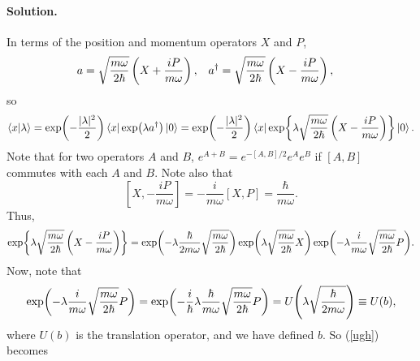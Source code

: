 \documentclass[11pt]{article}
\newcommand{\refeq}[1]{(\ref{#1})}
\newcommand{\beq}{\begin{equation*}}
\newcommand{\eeq}{\end{equation*}}
\newcommand{\beqn}{\begin{equation}}
\newcommand{\eeqn}{\end{equation}}
\newenvironment{solution}
{
    \paragraph{Solution.}
    \ignorespaces
}
{
}
\begin{document}
\begin{solution}
	In terms of the position and momentum operators $X$ and $P$,
	\begin{align*}
		a &= \sqrt{\frac{m\omega}{2\hbar}} \left( X + \frac{iP}{m\omega} \right), &
		a^\dagger &= \sqrt{\frac{m\omega}{2\hbar}} \left( X - \frac{iP}{m\omega} \right),
	\end{align*}
	so
	\beqn \label{ugh}
		\bkxlam = \exp(-\frac{|\lam|^2}{2}) \bx \exp(\lam \ad) \ko = \exp(-\frac{|\lam|^2}{2}) \bx \exp{\lam \sqrt{\frac{m\omega}{2\hbar}} \left( X - \frac{iP}{m\omega} \right)} \ko.
	\eeqn
	Note that for two operators $A$ and $B$, $e^{A + B} = e^{-[A, B] / 2} e^A e^B$ if $[A, B]$ commutes with each $A$ and $B$.  Note also that
	\beq
		\left[ X, -\frac{i P}{m \omega} \right] = -\frac{i}{m \omega} [X, P] = \frac{\hbar}{m \omega}.	
	\eeq
	Thus,
	\beq
		\exp{\lam \sqrt{\frac{m\omega}{2\hbar}} \left( X - \frac{iP}{m\omega} \right)} = \exp(-\lam \frac{\hbar}{2 m \omega} \sqrt{\frac{m\omega}{2\hbar}}) \exp(\lam \sqrt{\frac{m\omega}{2\hbar}} X) \exp(-\lam \frac{i}{m \omega} \sqrt{\frac{m\omega}{2\hbar}} P).
	\eeq
	Now, note that
	\beqn \label{defb}
		\exp(-\lam \frac{i}{m \omega} \sqrt{\frac{m\omega}{2\hbar}} P) = \exp(-\frac{i}{\hbar} \lam \frac{\hbar}{m \omega} \sqrt{\frac{m\omega}{2\hbar}} P) = U\!\left( \lam \sqrt{\frac{\hbar}{2 m \omega}} \right) \equiv U(b),
	\eeqn
	where $U(b)$ is the translation operator, and we have defined $b$.  So \refeq{ugh} becomes

\end{solution}
\end{document}
